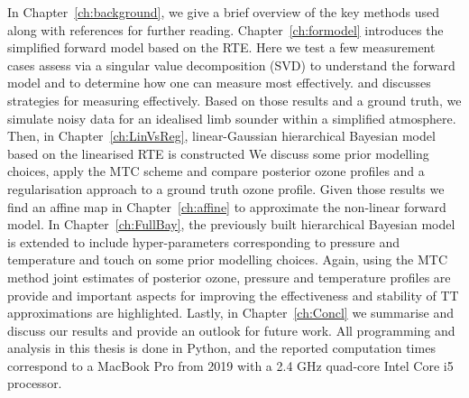 In Chapter~\ref{ch:background}, we give a brief overview of the key methods used along with references for further reading.
Chapter~\ref{ch:formodel} introduces the simplified forward model based on the RTE.
Here we test a few measurement cases assess via a singular value decomposition (SVD) to understand the forward model and to determine how one can measure most effectively. and discusses strategies for measuring effectively.
Based on those results and a ground truth, we simulate noisy data for an idealised limb sounder within a simplified atmosphere.
Then, in Chapter~\ref{ch:LinVsReg}, linear-Gaussian hierarchical Bayesian model based on the linearised RTE is constructed
We discuss some prior modelling choices, apply the MTC scheme and compare posterior ozone profiles and a regularisation approach to a ground truth ozone profile.
Given those results we find an affine map in Chapter~\ref{ch:affine} to approximate the non-linear forward model.
In Chapter~\ref{ch:FullBay}, the previously built hierarchical Bayesian model is extended to include hyper-parameters corresponding to pressure and temperature and touch on some prior modelling choices. 
Again, using the MTC method joint estimates of posterior ozone, pressure and temperature profiles are provide and important aspects for improving the effectiveness and stability of TT approximations are highlighted.
Lastly, in Chapter~\ref{ch:Concl} we summarise and discuss our results and provide an outlook for future work.
All programming and analysis in this thesis is done in Python, and the reported computation times correspond to a MacBook Pro from 2019 with a 2.4 GHz quad-core Intel Core i5 processor.
